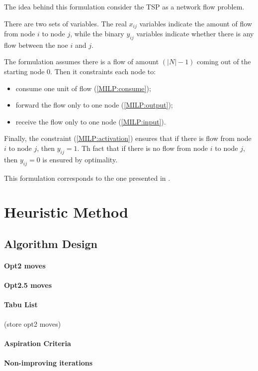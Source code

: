 \documentclass{article}
\begin{document}
The idea behind this formulation consider the TSP as a network flow problem.

There are two sets of variables. The real $x_{i j}$ variables indicate the amount of flow from node $i$ to node $j$, while the binary $y_{i j}$ variables indicate whether there is any flow between the noe $i$ and $j$.

The formulation assumes there is a flow of amount $(|N|-1)$ coming out of the starting node $0$.
Then it constraints each node to:
\begin{itemize}
    \item consume one unit of flow (\ref{MILP:consume});
    \item forward the flow only to one node (\ref{MILP:output});
    \item receive the flow only to one node (\ref{MILP:input}).
\end{itemize}

Finally, the constraint (\ref{MILP:activation}) ensures that if there is flow from node $i$ to node $j$, then $y_{i j} = 1$.
Th fact that if there is no flow from node $i$ to node $j$, then $y_{i j} = 0$ is ensured by optimality.

This formulation corresponds to the one presented in \cite{gavish1978travelling}.

\section{Heuristic Method}

\subsection{Algorithm Design}
\paragraph{Opt2 moves}
\paragraph{Opt2.5 moves}
\paragraph{Tabu List} (store opt2 moves)
\paragraph{Aspiration Criteria}
\paragraph{Non-improving iterations}
\end{document}
